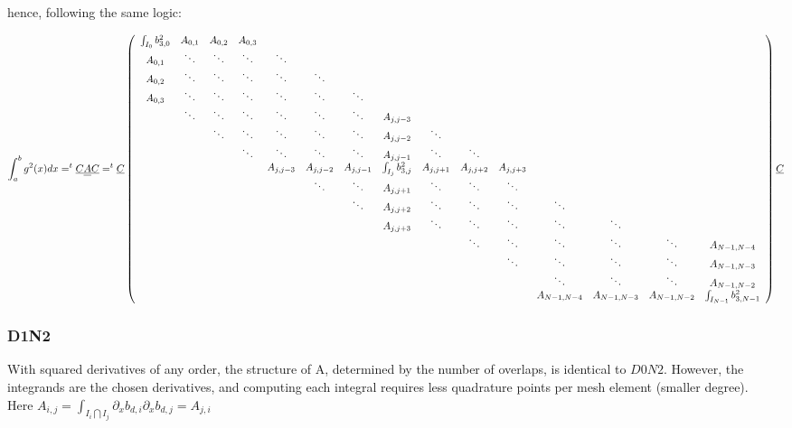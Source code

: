 \documentclass[paper=a4, fontsize=11pt]{book}
\numberwithin{equation}{section}		%
\numberwithin{figure}{section}			%
\numberwithin{table}{section}				%
\begin{document}
\begin{landscape}
hence, following the same logic:

$$
\int_{a}^{b} g^2(x)dx = ^t\underline{C}\underline{\underline{A}}\underline{C} = ^t\underline{C} \left(\begin{array}{ccccccccccccccc}
\int_{I_0}b_{3,0}^2&A_{0,1}&A_{0,2}&A_{0,3}&&&&&&&&&&&\\ A_{0,1}&\ddots&\ddots&\ddots&\ddots&&&&&&&&&&\\ A_{0,2}&\ddots&\ddots&\ddots&\ddots&\ddots&&&&&&&&&\\ A_{0,3}&\ddots&\ddots&\ddots&\ddots&\ddots&\ddots&&&&&&&&\\
&\ddots&\ddots&\ddots&\ddots&\ddots&\ddots&A_{j,j-3}&&&&&&&\\ &&\ddots&\ddots&\ddots&\ddots&\ddots&A_{j,j-2}&\ddots&&&&&&\\ &&&\ddots&\ddots&\ddots&\ddots&A_{j,j-1}&\ddots&\ddots&&&&&\\
&&&&A_{j,j-3}&A_{j,j-2}&A_{j,j-1}&\int_{I_j}b_{3,j}^2&A_{j,j+1}&A_{j,j+2}&A_{j,j+3}&&&&\\
&&&&&\ddots&\ddots&A_{j,j+1}&\ddots&\ddots&\ddots&&&&\\ &&&&&&\ddots&A_{j,j+2}&\ddots&\ddots&\ddots&\ddots&&&\\ &&&&&&&A_{j,j+3}&\ddots&\ddots&\ddots&\ddots&\ddots&&\\
&&&&&&&&&\ddots&\ddots&\ddots&\ddots&\ddots&A_{N-1,N-4}\\ &&&&&&&&&&\ddots&\ddots&\ddots&\ddots&A_{N-1,N-3}\\
&&&&&&&&&&&\ddots&\ddots&\ddots&A_{N-1,N-2}\\ &&&&&&&&&&&A_{N-1,N-4}&A_{N-1,N-3}&A_{N-1,N-2}&\int_{I_{N-1}}b_{3,N-1}^2
\end{array}\right) \underline{C}\\
$$

\newpage
\subsubsection{D1N2}

With squared derivatives of any order, the structure of A, determined by the number of overlaps, is identical to $D0N2$.
However, the integrands are the chosen derivatives, and computing each integral requires less quadrature points per mesh element (smaller degree).\\
Here $A_{i,j} = \int_{I_i\bigcap I_j}\partial_xb_{d,i}\partial_xb_{d,j} = A_{j,i}$


\end{landscape}
\end{document}
